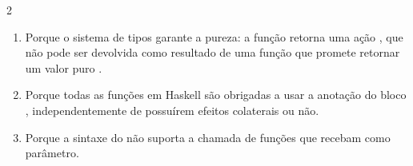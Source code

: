 \documentclass[a4paper,10pt,brazil]{article}
\begin{document}
\begin{multicols}{2}
\begin{enumerate}
  \item Porque o sistema de tipos garante a pureza: a função  retorna uma ação , que não pode ser devolvida como resultado de uma função que promete retornar um valor puro .

  \item Porque todas as funções em Haskell são obrigadas a usar a anotação do bloco , independentemente de possuírem efeitos colaterais ou não.

  \item Porque a sintaxe do  não suporta a chamada de funções que recebam  como parâmetro.


\end{enumerate}


\end{multicols}
\end{document}
